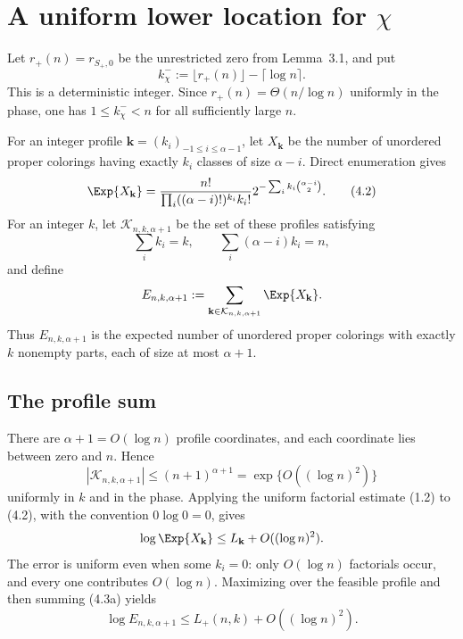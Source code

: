 \section{\texorpdfstring{A uniform lower location for
$\chi$}{A uniform lower location for chi}}
\label{a-valid-unrestricted-lower-location-for-chi}

Let $r_+(n)=r_{S_+,0}$ be the unrestricted zero from Lemma~3.1, and put
\begin{equation*}
  k_\chi^-:=\lfloor r_+(n)\rfloor-\lceil\log n\rceil.
  \tag{4.1}
\end{equation*}
This is a deterministic integer. Since
$r_+(n)=\Theta(n/\log n)$ uniformly in the phase, one has
$1\le k_\chi^-<n$ for all sufficiently large $n$.

For an integer profile
$\mathbf k=(k_i)_{-1\le i\le\alpha-1}$, let
$X_{\mathbf k}$ be the number of unordered proper colorings having exactly
$k_i$ classes of size $\alpha-i$. Direct enumeration gives
\begin{equation*}
  \Exp{X_{\mathbf k}}
  =\frac{n!}{\prod_i((\alpha-i)!)^{k_i}k_i!}
   2^{-\sum_i k_i\binom{\alpha-i}{2}}.
  \tag{4.2}
\end{equation*}
For an integer $k$, let $\mathcal K_{n,k,\alpha+1}$ be the set of these
profiles satisfying
\[
  \sum_i k_i=k,
  \qquad
  \sum_i(\alpha-i)k_i=n,
\]
and define
\[
  E_{n,k,\alpha+1}
  :=\sum_{\mathbf k\in\mathcal K_{n,k,\alpha+1}}
    \Exp{X_{\mathbf k}}.
\]
Thus $E_{n,k,\alpha+1}$ is the expected number of unordered proper colorings
with exactly $k$ nonempty parts, each of size at most $\alpha+1$.

\subsection*{The profile sum}

There are $\alpha+1=O(\log n)$ profile coordinates, and each coordinate lies
between zero and $n$. Hence
\begin{equation*}
  |\mathcal K_{n,k,\alpha+1}|
  \le(n+1)^{\alpha+1}
  =\exp\{O((\log n)^2)\}
  \tag{4.3a}
\end{equation*}
uniformly in $k$ and in the phase. Applying the uniform factorial estimate
(1.2) to (4.2), with the convention $0\log0=0$, gives
\[
  \log\Exp{X_{\mathbf k}}
  \le L_{\mathbf k}+O((\log n)^2).
\]
The error is uniform even when some $k_i=0$: only $O(\log n)$ factorials
occur, and every one contributes $O(\log n)$. Maximizing over the feasible
profile and then summing (4.3a) yields
\begin{equation*}
  \log E_{n,k,\alpha+1}
  \le L_+(n,k)+O((\log n)^2).
  \tag{4.3}
\end{equation*}

